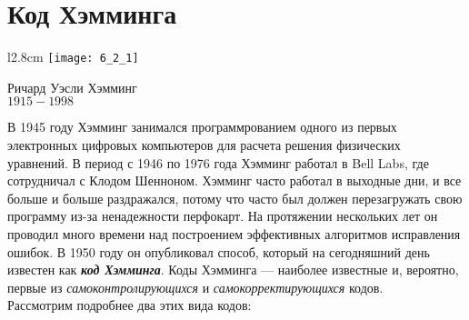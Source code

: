\section{Код Хэмминга}
\begin{wrapfigure}[14]{l}{2.8cm}
\texttt{[image: 6\_2\_1]}
\begin{center}
\footnotesize{Ричард Уэсли Хэмминг}
\\\footnotesize{$1915 - 1998$}
\end{center}
\end{wrapfigure}
В 1945 году Хэмминг занимался программрованием одного из первых электронных цифровых компьютеров для расчета решения физических уравнений.  В период с 1946 по 1976 года Хэмминг работал в Bell Labs, где сотрудничал с Клодом Шенноном. Хэмминг часто работал в выходные дни, и все больше и больше раздражался, потому что часто был должен перезагружать свою программу из-за ненадежности перфокарт. На протяжении нескольких лет он проводил много времени над построением эффективных алгоритмов исправления ошибок. В 1950 году он опубликовал способ, который на сегодняшний день известен как \textbf{\emph{код Хэмминга}}. Коды Хэмминга — наиболее известные и, вероятно, первые из \emph{самоконтролирующихся} и \emph{самокорректирующихся} кодов.\\
Рассмотрим подробнее два этих вида кодов:
